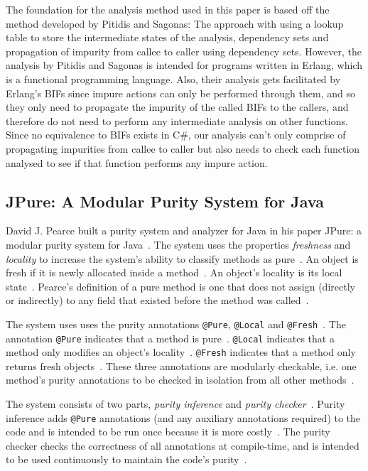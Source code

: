 \documentclass[a4paper,12pt]{article}
\begin{document}
The foundation for the analysis method used in this paper is based off the method developed by Pitidis and Sagonas: The approach with using a lookup table to store the intermediate states of the analysis, dependency sets and propagation of impurity from callee to caller using dependency sets. However, the analysis by Pitidis and Sagonas is intended for programs written in Erlang, which is a functional programming language. Also, their analysis gets facilitated by Erlang's BIFs since impure actions can only be performed through them, and so they only need to propagate the impurity of the called BIFs to the callers, and therefore do not need to perform any intermediate analysis on other functions. Since no equivalence to BIFs exists in C\#, our analysis can't only comprise of propagating impurities from callee to caller but also needs to check each function analysed to see if that function performs any impure action.

\subsection{JPure: A Modular Purity System for Java} \label{sub:JPure: A Modular Purity System for Java}
David J. Pearce built a purity system and analyzer for Java in his paper JPure: a modular purity system for Java~\cite{pearce2011jpure}. The system uses the properties \textit{freshness} and \textit{locality} to increase the system's ability to classify methods as pure~\cite{pearce2011jpure}. An object is fresh if it is newly allocated inside a method~\cite{pearce2011jpure}. An object's locality is its local state~\cite{pearce2011jpure}. Pearce's definition of a pure method is one that does not assign (directly or indirectly) to any field that existed before the method was called~\cite{pearce2011jpure}.

The system uses uses the purity annotations \texttt{@Pure}, \texttt{@Local} and \texttt{@Fresh}~\cite{pearce2011jpure}. The annotation \texttt{@Pure} indicates that a method is pure~\cite{pearce2011jpure}. \texttt{@Local} indicates that a method only modifies an object's locality~\cite{pearce2011jpure}. \texttt{@Fresh} indicates that a method only returns fresh objects~\cite{pearce2011jpure}. These three annotations are modularly checkable, i.e. one method's purity annotations to be checked in isolation from all other methods~\cite{pearce2011jpure}.

The system consists of two parts, \textit{purity inference} and \textit{purity checker}~\cite{pearce2011jpure}. Purity inference adds \texttt{@Pure} annotations (and any auxiliary annotations required) to the code and is intended to be run once because it is more costly~\cite{pearce2011jpure}. The purity checker checks the correctness of all annotations at compile-time, and is intended to be used continuously to maintain the code's purity~\cite{pearce2011jpure}.
\end{document}
